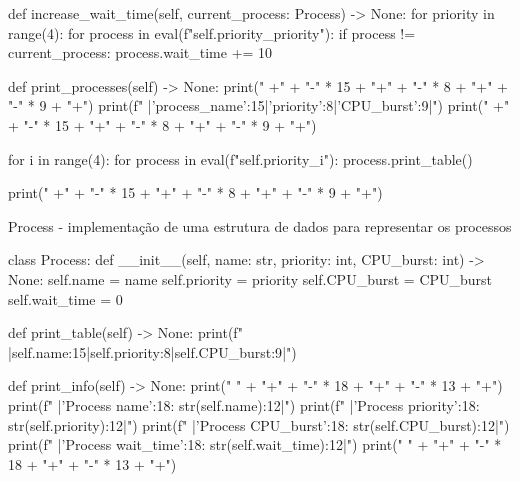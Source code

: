 \begin{python}
        
        def increase_wait_time(self, current_process: Process) -> None:
            for priority in range(4):
                for process in eval(f"self.priority_{priority}"):
                    if process != current_process:
                        process.wait_time += 10


        def print_processes(self) -> None:
            print("  +" + "-" * 15 + "+" + "-" * 8 + "+" + "-" * 9 + "+")
            print(f"  |{'process_name':15}|{'priority':8}|{'CPU_burst':9}|")
            print("  +" + "-" * 15 + "+" + "-" * 8 + "+" + "-" * 9 + "+")

            for i in range(4):
                for process in eval(f"self.priority_{i}"):
                    process.print_table()
            
            print("  +" + "-" * 15 + "+" + "-" * 8 + "+" + "-" * 9 + "+\n")
\end{python}

    Process - implementação de uma estrutura de dados para representar os processos
    \begin{python}
        class Process:
        def __init__(self, name: str, priority: int, CPU_burst: int) -> None:
            self.name = name
            self.priority = priority
            self.CPU_burst = CPU_burst
            self.wait_time = 0

        def print_table(self) -> None:
            print(f"  |{self.name:15}|{self.priority:8}|{self.CPU_burst:9}|")

        def print_info(self) -> None:
            print("  " + "+" + "-" * 18 + "+" + "-" * 13 + "+")
            print(f"  |{'Process name':18}: {str(self.name):12}|")
            print(f"  |{'Process priority':18}: {str(self.priority):12}|")
            print(f"  |{'Process CPU_burst':18}: {str(self.CPU_burst):12}|")
            print(f"  |{'Process wait_time':18}: {str(self.wait_time):12}|")
            print("  " + "+" + "-" * 18 + "+" + "-" * 13 + "+")
    \end{python}

